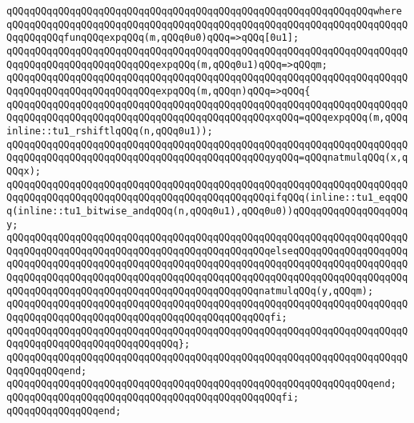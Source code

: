 \verb|qQQqqQQqqQQqqQQqqQQqqQQqqQQqqQQqqQQqqQQqqQQqqQQqqQQqqQQqqQQqqQQqwhere|\newline
\verb|qQQqqQQqqQQqqQQqqQQqqQQqqQQqqQQqqQQqqQQqqQQqqQQqqQQqqQQqqQQqqQQqqQQqqQQqqQQqqQQqfunqQQqexpqQQq(m,qQQq0u0)qQQq=>qQQq[0u1];|\newline
\verb|qQQqqQQqqQQqqQQqqQQqqQQqqQQqqQQqqQQqqQQqqQQqqQQqqQQqqQQqqQQqqQQqqQQqqQQqqQQqqQQqqQQqqQQqqQQqqQQqexpqQQq(m,qQQq0u1)qQQq=>qQQqm;|\newline
\verb|qQQqqQQqqQQqqQQqqQQqqQQqqQQqqQQqqQQqqQQqqQQqqQQqqQQqqQQqqQQqqQQqqQQqqQQqqQQqqQQqqQQqqQQqqQQqqQQqexpqQQq(m,qQQqn)qQQq=>qQQq{|\newline
\verb|qQQqqQQqqQQqqQQqqQQqqQQqqQQqqQQqqQQqqQQqqQQqqQQqqQQqqQQqqQQqqQQqqQQqqQQqqQQqqQQqqQQqqQQqqQQqqQQqqQQqqQQqqQQqqQQqqQQqxqQQq=qQQqexpqQQq(m,qQQqinline::tu1_rshiftlqQQq(n,qQQq0u1));|\newline
\verb|qQQqqQQqqQQqqQQqqQQqqQQqqQQqqQQqqQQqqQQqqQQqqQQqqQQqqQQqqQQqqQQqqQQqqQQqqQQqqQQqqQQqqQQqqQQqqQQqqQQqqQQqqQQqqQQqqQQqyqQQq=qQQqnatmulqQQq(x,qQQqx);|\newline
\newline
\verb|qQQqqQQqqQQqqQQqqQQqqQQqqQQqqQQqqQQqqQQqqQQqqQQqqQQqqQQqqQQqqQQqqQQqqQQqqQQqqQQqqQQqqQQqqQQqqQQqqQQqqQQqqQQqqQQqqQQqifqQQq(inline::tu1_eqqQQq(inline::tu1_bitwise_andqQQq(n,qQQq0u1),qQQq0u0))qQQqqQQqqQQqqQQqqQQqy;|\newline
\verb|qQQqqQQqqQQqqQQqqQQqqQQqqQQqqQQqqQQqqQQqqQQqqQQqqQQqqQQqqQQqqQQqqQQqqQQqqQQqqQQqqQQqqQQqqQQqqQQqqQQqqQQqqQQqqQQqqQQqelseqQQqqQQqqQQqqQQqqQQqqQQqqQQqqQQqqQQqqQQqqQQqqQQqqQQqqQQqqQQqqQQqqQQqqQQqqQQqqQQqqQQqqQQqqQQqqQQqqQQqqQQqqQQqqQQqqQQqqQQqqQQqqQQqqQQqqQQqqQQqqQQqqQQqqQQqqQQqqQQqqQQqqQQqqQQqqQQqqQQqqQQqqQQqqQQqqQQqqQQqqQQqnatmulqQQq(y,qQQqm);|\newline
\verb|qQQqqQQqqQQqqQQqqQQqqQQqqQQqqQQqqQQqqQQqqQQqqQQqqQQqqQQqqQQqqQQqqQQqqQQqqQQqqQQqqQQqqQQqqQQqqQQqqQQqqQQqqQQqqQQqqQQqfi;|\newline
\verb|qQQqqQQqqQQqqQQqqQQqqQQqqQQqqQQqqQQqqQQqqQQqqQQqqQQqqQQqqQQqqQQqqQQqqQQqqQQqqQQqqQQqqQQqqQQqqQQqqQQq};|\newline
\verb|qQQqqQQqqQQqqQQqqQQqqQQqqQQqqQQqqQQqqQQqqQQqqQQqqQQqqQQqqQQqqQQqqQQqqQQqqQQqqQQqend;|\newline
\verb|qQQqqQQqqQQqqQQqqQQqqQQqqQQqqQQqqQQqqQQqqQQqqQQqqQQqqQQqqQQqqQQqend;|\newline
\verb|qQQqqQQqqQQqqQQqqQQqqQQqqQQqqQQqqQQqqQQqqQQqqQQqfi;|\newline
\verb|qQQqqQQqqQQqqQQqend;|\newline
\newline
